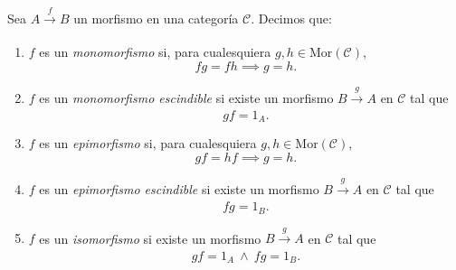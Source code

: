 \documentclass[tesis]{subfiles}
\begin{document}
\begin{Def} \label{Def: Morfismos especiales}
    Sea $A\xrightarrow[]{f} B$ un morfismo en una categoría $\mathscr{C}$. Decimos que:

    \begin{enumerate}[label=(\alph*)]
        \item $f$ es un \emph{monomorfismo} si, para cualesquiera $g,h\in\text{Mor}(\mathscr{C})$,
            \[
            fg=fh \implies g=h.
            \] 

        \item $f$ es un \emph{monomorfismo escindible} si existe un morfismo $B\xrightarrow[]{g} A$ en $\mathscr{C}$ tal que
            \[
                gf=1_A.
            \] 
            
        \item $f$ es un \emph{epimorfismo} si, para cualesquiera $g,h\in\text{Mor}(\mathscr{C})$,
            \[
            gf=hf \implies g=h.
            \] 
            
        \item $f$ es un \emph{epimorfismo escindible} si existe un morfismo $B\xrightarrow[]{g} A$ en $\mathscr{C}$ tal que
            \[
                fg=1_B.
            \] 

        \item $f$ es un \emph{isomorfismo} si existe un morfismo $B\xrightarrow[]{g} A$ en $\mathscr{C}$ tal que
            \[
            gf = 1_A \ \land \ fg = 1_B.
            \] 
    \end{enumerate}
\end{Def}
\end{document}
